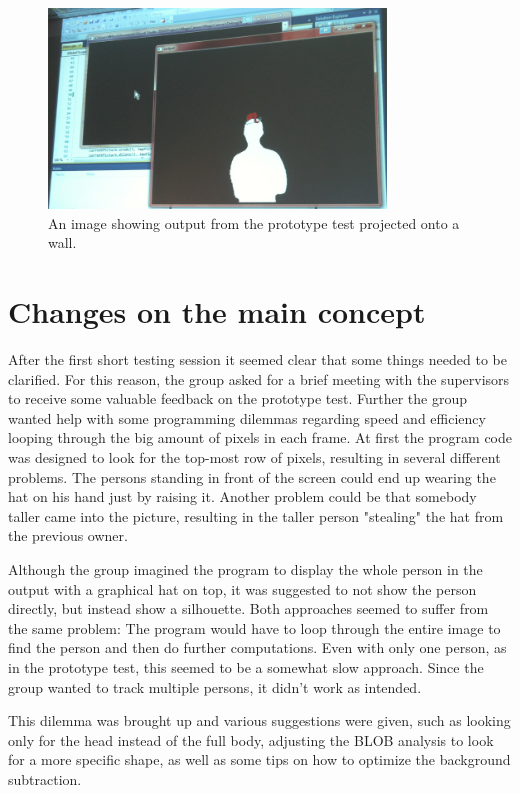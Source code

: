 \begin{figure}[htbp]
\centering
\includegraphics[width=0.80\textwidth]{Pictures/Test/MaxSubtracted.jpg}
\caption{An image showing output from the prototype test projected onto a wall.}
\label{fig:max_subtracted}
\end{figure}

\section{Changes on the main concept}
After the first short testing session it seemed clear that some things needed to be clarified. For this reason, the group asked for a brief meeting with the supervisors to receive some valuable feedback on the prototype test. Further the group wanted help with some programming dilemmas regarding speed and efficiency looping through the big amount of pixels in each frame. At first the program code was designed to look for the top-most row of pixels, resulting in several different problems. The persons standing in front of the screen could end up wearing the hat on his hand just by raising it. Another problem could be that somebody taller came into the picture, resulting in the taller person "stealing" the hat from the previous owner.

Although the group imagined the program to display the whole person in the output with a graphical hat on top, it was suggested to not show the person directly, but instead show a silhouette. Both approaches seemed to suffer from the same problem: The program would have to loop through the entire image to find the person and then do further computations. Even with only one person, as in the prototype test, this seemed to be a somewhat slow approach. Since the group wanted to track multiple persons, it didn't work as intended.

This dilemma was brought up and various suggestions were given, such as looking only for the head instead of the full body, adjusting the BLOB analysis to look for a more specific shape, as well as some tips on how to optimize the background subtraction.

